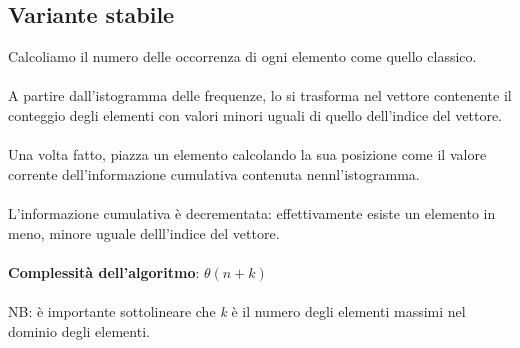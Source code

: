 \documentclass{article}
\begin{document}
        \subsection{Variante stabile}
        Calcoliamo il numero delle occorrenza di ogni elemento come quello classico.\\
        \\
        A partire dall'istogramma delle frequenze, lo si trasforma nel vettore contenente il conteggio degli elementi con valori minori uguali di quello dell'indice del vettore.\\
        \\
        Una volta fatto, piazza un elemento calcolando la sua posizione come il valore corrente dell'informazione cumulativa contenuta nennl'istogramma.\\
        \\
        L'informazione cumulativa è decrementata: effettivamente esiste un elemento in meno, minore uguale delll'indice del vettore.\\
        \\
        \textbf{Complessità dell'algoritmo}: $\theta(n + k)$\\
        \\
        NB: è importante sottolineare che \emph{k} è il numero degli elementi massimi nel dominio degli elementi.\\
        
        
    
\end{document}
